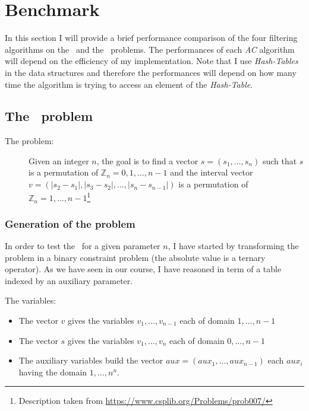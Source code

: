 \documentclass{rapport}
\begin{document}
\section{Benchmark}

In this section I will provide a brief performance comparison of the four filtering algorithms on the \allint\ and the \queens\ problems. The performances of each \textit{AC} algorithm will depend on the efficiency of my implementation. Note that I use \textit{Hash-Tables} in the data structures and therefore the performances will depend on how many time the algorithm is trying to access an element of the \textit{Hash-Table}.

\subsection{The \allint\ problem}

\begin{description}
  \item[The problem:] Given an integer $n$, the goal is to find a vector $s = (s_1, \dots, s_n)$ such that $s$ is a permutation of $\mathbb{Z}_n = 0, 1, \dots, n - 1$ and the interval vector $v = (|s_2-s_1|, |s_3-s_2|,\dots, |s_n-s_{n-1}|)$ is a permutation of $\mathbb{Z}_n = 1, \dots, n - 1$\footnote{Description taken from \url{https://www.csplib.org/Problems/prob007/}}
\end{description}

\subsubsection{Generation of the problem}
\label{sec:allIntGen}

In order to test the \allint\ for a given parameter $n$, I have started by transforming the problem in a binary constraint problem (the absolute value is a ternary operator). As we have seen in our course, I have reasoned in term of a table indexed by an auxiliary parameter.

The variables:

\begin{itemize}
  \item The vector $v$ gives the variables $v_1, \dots, v_{n-1}$ each of domain $1, \dots, n - 1$
  \item The vector $s$ gives the variables $v_1, \dots, v_{n}$ each of domain $0, \dots, n - 1$
  \item The auxiliary variables build the vector $aux = (aux_1, \dots, aux_{n-1})$ each $aux_i$ having the domain $1, \dots, n^n$.
\end{itemize}
\end{document}
